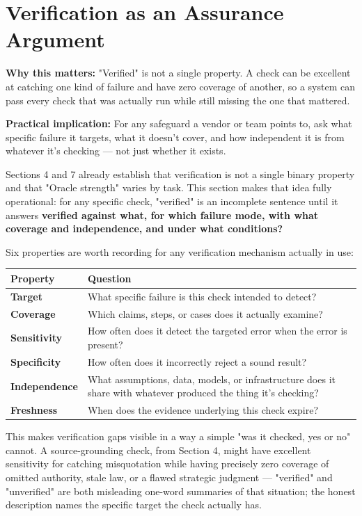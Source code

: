 \section{Verification as an Assurance Argument}

\textbf{Why this matters:} "Verified" is not a single property. A check can be excellent at catching one kind of failure and have zero coverage of another, so a system can pass every check that was actually run while still missing the one that mattered.

\textbf{Practical implication:} For any safeguard a vendor or team points to, ask what specific failure it targets, what it doesn't cover, and how independent it is from whatever it's checking --- not just whether it exists.

Sections 4 and 7 already establish that verification is not a single binary property and that "Oracle strength" varies by task. This section makes that idea fully operational: for any specific check, "verified" is an incomplete sentence until it answers \textbf{verified against what, for which failure mode, with what coverage and independence, and under what conditions?}

Six properties are worth recording for any verification mechanism actually in use:

\begin{center}
\begin{tabular}{|p{}|p{}|}
\hline
Property & Question \\
\hline
\textbf{Target} & What specific failure is this check intended to detect? \\
\hline
\textbf{Coverage} & Which claims, steps, or cases does it actually examine? \\
\hline
\textbf{Sensitivity} & How often does it detect the targeted error when the error is present? \\
\hline
\textbf{Specificity} & How often does it incorrectly reject a sound result? \\
\hline
\textbf{Independence} & What assumptions, data, models, or infrastructure does it share with whatever produced the thing it's checking? \\
\hline
\textbf{Freshness} & When does the evidence underlying this check expire? \\
\hline
\end{tabular}
\end{center}

This makes verification gaps visible in a way a simple "was it checked, yes or no" cannot. A source-grounding check, from Section 4, might have excellent sensitivity for catching misquotation while having precisely zero coverage of omitted authority, stale law, or a flawed strategic judgment --- "verified" and "unverified" are both misleading one-word summaries of that situation; the honest description names the specific target the check actually has.

